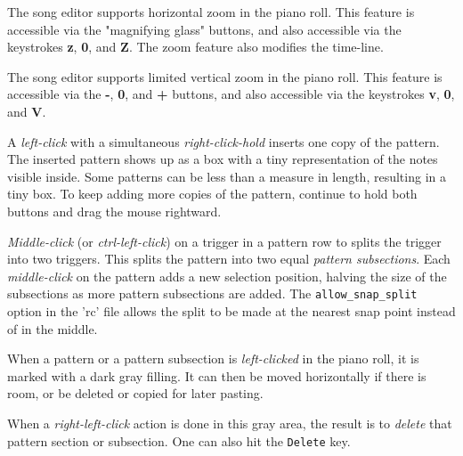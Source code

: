    The song editor supports horizontal zoom in the piano roll.
   This feature is accessible via the "magnifying glass" buttons, and also
   accessible via the keystrokes \textbf{z}, \textbf{0}, and \textbf{Z}.
   The zoom feature also modifies the time-line.

   The song editor supports limited vertical zoom in the piano roll.
   This feature is accessible via the \textbf{-}, \textbf{0}, and
   \textbf{+} buttons, and also
   accessible via the keystrokes \textbf{v}, \textbf{0}, and \textbf{V}.

   A \textsl{left-click} with a simultaneous
   \textsl{right-click-hold} inserts one copy of the
   pattern.  The inserted pattern shows up as a box with a tiny
   representation of the notes visible inside.  Some patterns can
   be less than a measure in length, resulting in a tiny box.
   To keep adding more copies of the pattern, continue to hold both buttons
   and drag the mouse rightward.

   \textsl{Middle-click} (or \textsl{ctrl-left-click})
   on a trigger in a pattern row
   to splits the trigger into two triggers.
   This splits the pattern into two equal \textsl{pattern subsections}.
   Each \textsl{middle-click} on the pattern adds a new selection position,
   halving the size of the subsections as more pattern subsections are
   added.  The \texttt{allow\_snap\_split} option in the 'rc' file
   allows the split to be made at the nearest snap point instead of in the
   middle.

   When a pattern or a pattern subsection is
   \textsl{left-clicked} in the piano
   roll, it is marked with a dark gray filling.
   It can then be moved horizontally if there is room, or be deleted or copied
   for later pasting.

   When a 
   \textsl{right-left-click} action is done in this gray area, the result
   is to \textsl{delete} that pattern section or subsection.
   One can also hit the \texttt{Delete} key.

